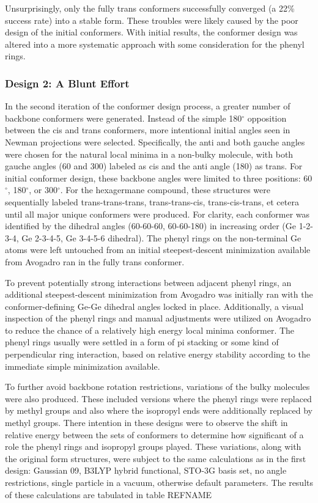 Unsurprisingly, only the fully trans conformers successfully converged (a 22\% success rate) into a stable form. 
These troubles were likely caused by the poor design of the initial conformers. 
With initial results, the conformer design was altered into a more systematic approach with some consideration for the phenyl rings.

\subsubsection{Design 2: A Blunt Effort}

In the second iteration of the conformer design process, a greater number of backbone conformers were generated. 
Instead of the simple 180$^{\circ}$ opposition between the cis and trans conformers, more intentional initial angles seen in Newman projections were selected.
Specifically, the anti and both gauche angles were chosen for the natural local minima in a non-bulky molecule, with both gauche angles (60 and 300) labeled as cis and the anti angle (180) as trans. 
For initial conformer design, these backbone angles were limited to three positions: 60$^{\circ}$, 180$^{\circ}$, or 300$^{\circ}$.
For the hexagermane compound, these structures were sequentially labeled trans-trans-trans, trans-trans-cis, trans-cis-trans, et cetera until all major unique conformers were produced.
For clarity, each conformer was identified by the dihedral angles (60-60-60, 60-60-180) in increasing order (Ge 1-2-3-4, Ge 2-3-4-5, Ge 3-4-5-6 dihedral).
The phenyl rings on the non-terminal Ge atoms were left untouched from an initial steepest-descent minimization available from Avogadro ran in the fully trans conformer.

To prevent potentially strong interactions between adjacent phenyl rings, an additional steepest-descent minimization from Avogadro was initially ran with the conformer-defining Ge-Ge dihedral angles locked in place. 
Additionally, a visual inspection of the phenyl rings and manual adjustments were utilized on Avogadro to reduce the chance of a relatively high energy local minima conformer. 
The phenyl rings usually were settled in a form of pi stacking or some kind of perpendicular ring interaction, based on relative energy stability according to the immediate simple minimization available. 

To further avoid backbone rotation restrictions, variations of the bulky molecules were also produced. 
These included versions where the phenyl rings were replaced by methyl groups and also where the isopropyl ends were additionally replaced by methyl groups. 
There intention in these designs were to observe the shift in relative energy between the sets of conformers to determine how significant of a role the phenyl rings and isopropyl groups played.
These variations, along with the original form structures, were subject to the same calculations as in the first design: Gaussian 09, B3LYP hybrid functional, STO-3G basis set, no angle restrictions, single particle in a vacuum, otherwise default parameters.
The results of these calculations are tabulated in table
REFNAME

